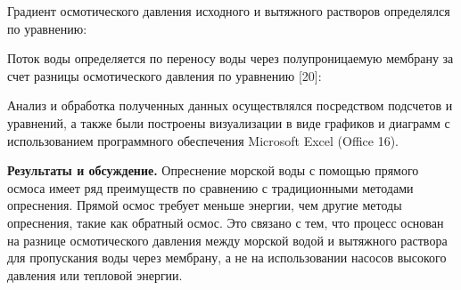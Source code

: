 Градиент осмотического давления исходного и вытяжного растворов
определялся по уравнению:


Поток воды определяется по переносу воды через полупроницаемую мембрану
за счет разницы осмотического давления по уравнению {[}20{]}:


Анализ и обработка полученных данных осуществлялся посредством подсчетов
и уравнений, а также были построены визуализации в виде графиков и
диаграмм с использованием программного обеспечения Microsoft Excel
(Office 16).

{\bfseries Результаты и обсуждение.} Опреснение морской воды с помощью
прямого осмоса имеет ряд преимуществ по сравнению с традиционными
методами опреснения. Прямой осмос требует меньше энергии, чем другие
методы опреснения, такие как обратный осмос. Это связано с тем, что
процесс основан на разнице осмотического давления между морской водой и
вытяжного раствора для пропускания воды через мембрану, а не на
использовании насосов высокого давления или тепловой энергии.

